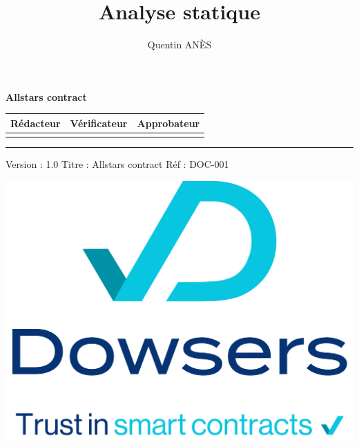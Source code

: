 \documentclass[10pt,a4paper]{article}
\begin{document}
\begin{titlepage}
\newcommand{\doctitle}{Allstars contract}

\centering
\vspace*{4cm}
{\huge \textbf{\doctitle}}\vfill

\vspace*{12cm}
\begin{tabular}{|c|c|c|}
\hline
\textbf{Rédacteur} & \textbf{Vérificateur} & \textbf{Approbateur} \\
\hline
& & \\
\hline
\end{tabular}

\vspace{0.5cm}
\noindent\rule{10cm}{0.4pt}
\vspace{1cm}
\begin{flushright}
\begin{center}
Version : 1.0 \hspace{1cm} Titre : \doctitle \hspace{1cm} Réf : DOC-001
\end{center}
\end{flushright}

\end{titlepage}

\newpage
\author{Quentin ANÈS}
\title{Analyse statique}


\pagestyle{fancy}


\fancyhead[L]{}
\fancyhead[R]{}

\renewcommand{\footrulewidth}{1pt}
\fancyfoot[R]{\today}

\begin{center}
\includegraphics[width = 0.5\linewidth]{./images/dowsers_logo_signature.png}
\end{center}
\end{document}

